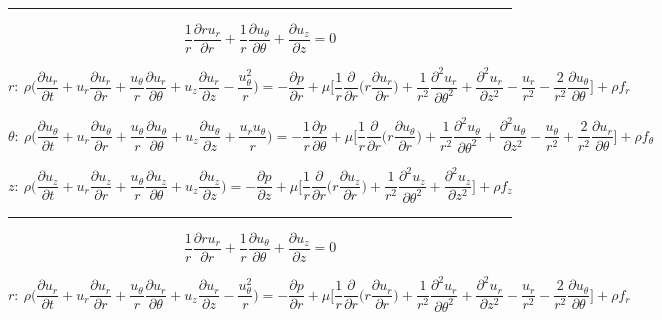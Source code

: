 \documentclass{article}
\begin{document}
\hrule \vspace{.5cm}
            \[\frac{1}{r}\frac{\partial ru_{r}}{\partial r} + \frac{1}{r}\frac{\partial u_{\theta}}{\partial \theta} + \frac{\partial u_{z}}{\partial z}=0\]
            
            \[r: \ \rho \bigg(\frac{\partial u_{r}}{\partial t} + u_{r} \frac{\partial u_{r}}{\partial r} + \frac{u_{\theta}}{r}\frac{\partial u_{r}}{\partial \theta} + u_{z}\frac{\partial u_{r}}{\partial z} - \frac{u_{\theta}^{2}}{r} \bigg) = -\frac{\partial p}{\partial r} + \mu \bigg[ \frac{1}{r}\frac{\partial}{\partial r} \bigg(r \frac{\partial u_{r}}{\partial r}\bigg) + \frac{1}{r^{2}} \frac{\partial^{2} u_{r}}{\partial \theta^{2}} + \frac{\partial^{2} u_{r}}{\partial z^{2}} - \frac{u_{r}}{r^{2}} - \frac{2}{r^{2}}\frac{\partial u_{\theta}}{\partial \theta}\bigg] + \rho f_{r}\]
            
            \[\theta: \ \rho \bigg(\frac{\partial u_{\theta}}{\partial t} + u_{r} \frac{\partial u_{\theta}}{\partial r} + \frac{u_{\theta}}{r} \frac{\partial u_{\theta}}{\partial \theta} + u_{z}\frac{\partial u_{\theta}}{\partial z} + \frac{u_{r}u_{\theta}}{r} \bigg) = -\frac{1}{r} \frac{\partial p}{\partial \theta} + \mu \bigg[ \frac{1}{r}\frac{\partial}{\partial r} \bigg(r \frac{\partial u_{\theta}}{\partial r}\bigg) + \frac{1}{r^{2}} \frac{\partial^{2} u_{\theta}}{\partial \theta^{2}} + \frac{\partial^{2} u_{\theta}}{\partial z^{2}} - \frac{u_{\theta}}{r^{2}} + \frac{2}{r^{2}}\frac{\partial u_{r}}{\partial \theta}\bigg] + \rho f_{\theta}\]
            
            \[z: \ \rho \bigg(\frac{\partial u_{z}}{\partial t} + u_{r} \frac{\partial u_{z}}{\partial r} + \frac{u_{\theta}}{r}\frac{\partial u_{z}}{\partial \theta} + u_{z}\frac{\partial u_{z}}{\partial z} \bigg) = -\frac{\partial p}{\partial z} + \mu \bigg[ \frac{1}{r}\frac{\partial}{\partial r} \bigg(r \frac{\partial u_{z}}{\partial r}\bigg) + \frac{1}{r^{2}} \frac{\partial^{2} u_{z}}{\partial \theta^{2}} + \frac{\partial^{2} u_{z}}{\partial z^{2}} \bigg] + \rho f_{z}\]

 \vspace{.5cm} \hrule   \vspace{.5cm}

 \[\frac{1}{r}\frac{\partial ru_{r}}{\partial r} + \frac{1}{r}\frac{\partial u_{\theta}}{\partial \theta} + \frac{\partial u_{z}}{\partial z}=0\]
            
            \[r: \ \rho \bigg(\frac{\partial u_{r}}{\partial t} + u_{r} \frac{\partial u_{r}}{\partial r} + \frac{u_{\theta}}{r}\frac{\partial u_{r}}{\partial \theta} + u_{z}\frac{\partial u_{r}}{\partial z} - \frac{u_{\theta}^{2}}{r} \bigg) = -\frac{\partial p}{\partial r} + \mu \bigg[ \frac{1}{r}\frac{\partial}{\partial r} \bigg(r \frac{\partial u_{r}}{\partial r}\bigg) + \frac{1}{r^{2}} \frac{\partial^{2} u_{r}}{\partial \theta^{2}} + \frac{\partial^{2} u_{r}}{\partial z^{2}} - \frac{u_{r}}{r^{2}} - \frac{2}{r^{2}}\frac{\partial u_{\theta}}{\partial \theta}\bigg] + \rho f_{r}\]
            
\end{document}
